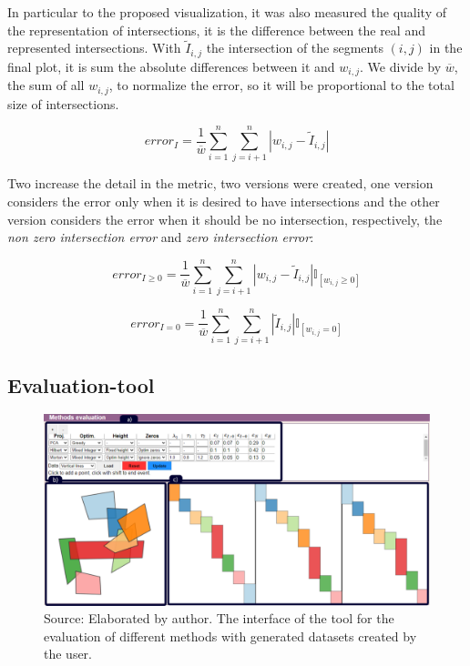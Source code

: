 In particular to the proposed visualization, it was also measured the quality of the representation of intersections, it is the difference between the real and represented intersections. 
%
With  $\tilde{I}_{i, j}$ the intersection of the segments $(i, j)$ in the final plot, it is sum the absolute differences between it and $w_{i, j}$. We divide by  $\overline{w}$, the sum of all $w_{i, j}$, to normalize the error, so it will be proportional to the total size of intersections.

\begin{equation}
    error_I = \frac{1}{\overline{w}}\sum_{i =1}^n \sum_{j = i +1}^n |w_{i, j} - \tilde{I}_{i, j}|
\end{equation}

Two increase the detail in the metric, two versions were created, one version considers the error only when it is desired to have intersections and the other version considers the error when it should be no intersection, respectively, the \textit{non zero intersection error} and \textit{zero intersection error}:

\begin{equation}
    error_{I \geq 0} = \frac{1}{\overline{w}}\sum_{i =1}^n \sum_{j = i +1}^n |w_{i, j} - \tilde{I}_{i, j}| \mathbb{I}_{[w_{i, j} \geq 0]}
\end{equation}

\begin{equation}
    error_{I = 0} = \frac{1}{\overline{w}}\sum_{i =1}^n \sum_{j = i +1}^n |\tilde{I}_{i, j}| \mathbb{I}_{[w_{i, j} = 0]}
\end{equation}


\subsection{Evaluation-tool}
\label{sec:evaluation-tool}

\begin{figure}
    \centering
    \includegraphics[width = \textwidth]{src/imgs/evaluation-tool.pdf}
    \caption{Source: Elaborated by author. The interface of the tool for the evaluation of different methods with generated datasets created by the user.}
    \label{fig:evaluation-tool}
\end{figure}

